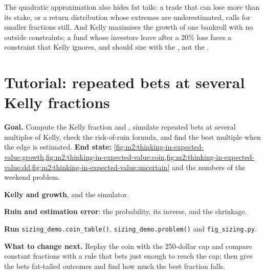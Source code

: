 The quadratic approximation also hides fat tails: a trade that can lose more than its
stake, or a return distribution whose extremes are underestimated, calls for smaller
fractions still. And Kelly maximises the growth of one bankroll with no outside
constraints; a fund whose investors leave after a 20\% loss faces a 
constraint that Kelly ignores, and should size with the , not the .

\section{Tutorial: repeated bets at several Kelly fractions}\label{tut:m2:thinking-in-expected-value:sizing}

\begin{tutorial}
\textbf{Goal.} Compute the Kelly fraction and , simulate repeated bets at
several multiples of Kelly, check the risk-of-ruin formula, and find the best multiple
when the edge is estimated.
\textbf{End state:} \cref{fig:m2:thinking-in-expected-value:growth,fig:m2:thinking-in-expected-value:coin,fig:m2:thinking-in-expected-value:dd,fig:m2:thinking-in-expected-value:uncertain}
and the numbers of the weekend problem.
\begin{tutsteps}
\item \textbf{Kelly and growth}, and the simulator.
\label{lst:m2:thinking-in-expected-value:kelly}
\item \textbf{Ruin and estimation error}: the  probability, its inverse, and the
shrinkage.
\label{lst:m2:thinking-in-expected-value:ruin}
\item \textbf{Run} \texttt{sizing\_demo.coin\_table()}, \texttt{sizing\_demo.problem()}
and \texttt{fig\_sizing.py}.
\end{tutsteps}
\textbf{What to change next.} Replay the coin with the 250-dollar cap and compare
constant fractions with a rule that bets just enough to reach the cap; then give the
bets fat-tailed outcomes and find how much the best fraction falls.
\end{tutorial}

